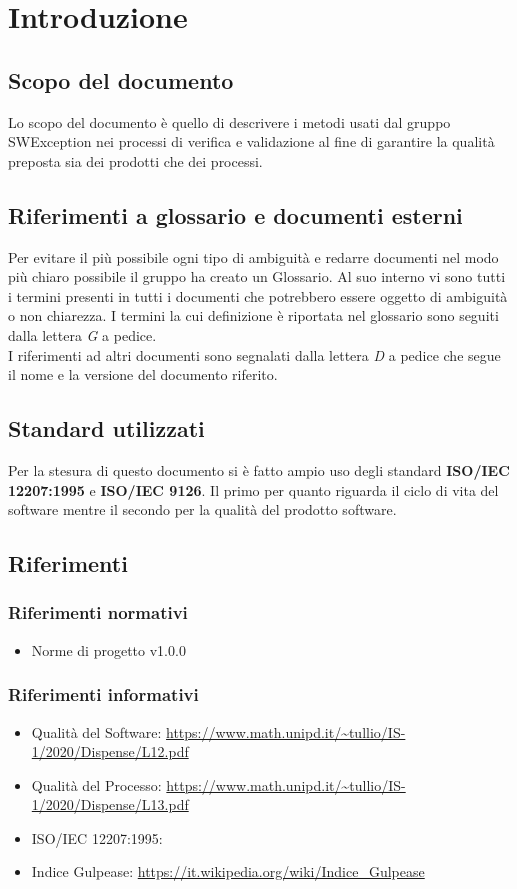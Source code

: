 \section{Introduzione} \label{_introduzione}
\subsection{Scopo del documento}
Lo scopo del documento è quello di descrivere i metodi usati dal gruppo SWException nei processi di verifica e validazione al fine di garantire la qualità preposta sia dei prodotti che dei processi.

\subsection{Riferimenti a glossario e documenti esterni}
Per evitare il più possibile ogni tipo di ambiguità e redarre documenti nel modo più chiaro possibile il gruppo ha creato un Glossario. Al suo interno vi sono tutti i termini presenti in tutti i documenti che potrebbero essere oggetto di ambiguità o non chiarezza. I termini la cui definizione è riportata nel glossario sono seguiti dalla lettera \textit{G} a pedice.\\
I riferimenti ad altri documenti sono segnalati dalla lettera \textit{D} a pedice che segue il nome e la versione del documento riferito.
\subsection{Standard utilizzati}
Per la stesura di questo documento si è fatto ampio uso degli standard \textbf{ISO/IEC 12207:1995} e \textbf{ISO/IEC 9126}. Il primo per quanto riguarda il ciclo di vita del software mentre il secondo per la qualità del prodotto software.
\subsection{Riferimenti}
\subsubsection{Riferimenti normativi}
\begin{itemize}
    \item Norme di progetto v1.0.0
\end{itemize}
\subsubsection{Riferimenti informativi}
\begin{itemize}
    \item Qualità del Software: \url{https://www.math.unipd.it/~tullio/IS-1/2020/Dispense/L12.pdf}
    \item Qualità del Processo: \url{https://www.math.unipd.it/~tullio/IS-1/2020/Dispense/L13.pdf}
    \item ISO/IEC 12207:1995: 
    \item Indice Gulpease: \url{https://it.wikipedia.org/wiki/Indice_Gulpease}
\end{itemize}
